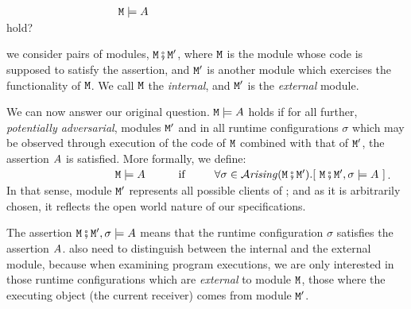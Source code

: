 
 \\
$~ \strut  \hspace{1.3in}\ {\mbox{\tt{\ensuremath{{\mbox{\tt{M}}}}}}} \models A$ \\
hold? 
   
  we consider
 pairs of modules, 
${\mbox{\tt{\ensuremath{{\mbox{\tt{M}}}}}}} \fatsemi {{\mbox{\tt{\ensuremath{{\mbox{\tt{M}}}}}}}'}$,  where ${\mbox{\tt{\ensuremath{{\mbox{\tt{M}}}}}}}$ is the module 
whose code is supposed to satisfy the assertion,
and ${\mbox{\tt{\ensuremath{{\mbox{\tt{M}}}}}}}'$  is  another %
 module which exercises
the functionality of ${\mbox{\tt{\ensuremath{{\mbox{\tt{M}}}}}}}$. We call ${\mbox{\tt{\ensuremath{{\mbox{\tt{M}}}}}}}$ the {\em internal}, and ${\mbox{\tt{\ensuremath{{\mbox{\tt{M}}}}}}}'$ is the {\em external} module.
    
We can now answer our original question.  ${\mbox{\tt{\ensuremath{{\mbox{\tt{M}}}}}}} \models A$ 
  holds if for all further, {\em potentially adversarial}, modules ${\mbox{\tt{\ensuremath{{\mbox{\tt{M}}}}}}}'$ and in  all runtime configurations $\sigma$ which may be observed through execution of the code of ${\mbox{\tt{\ensuremath{{\mbox{\tt{M}}}}}}}$ combined with that of ${\mbox{\tt{\ensuremath{{\mbox{\tt{M}}}}}}}'$, the assertion $A$ is satisfied. More formally, we define:\\
$~ \strut  \hspace{1.3in} \M \models \A \ \ \  \ \ \ \ \ \mbox{
if               } \ \ \  \ \ \  \  \forall \sigma\in\Arising
{\M \mkpair  {\M'}}. [\ \M \mkpair  {\M'},\sigma \models \A\ ]$.  \\
In that sense, module ${\mbox{\tt{\ensuremath{{\mbox{\tt{M}}}}}}}'$ represents all possible clients of {\M}; and as it is arbitrarily chosen, it reflects the open world nature of our specifications.%
{}

The assertion ${\mbox{\tt{\ensuremath{{\mbox{\tt{M}}}}}}} \fatsemi  {{\mbox{\tt{\ensuremath{{\mbox{\tt{M}}}}}}}'},\sigma \models A$ means that the runtime configuration $\sigma$ satisfies the 
assertion $A$.  also need to distinguish between  the internal and the external module,
because when examining program executions, we are only interested
 in those runtime configurations which are {\em external} to module ${\mbox{\tt{\ensuremath{{\mbox{\tt{M}}}}}}}$, \ie those where the
 executing object (\ie the current receiver) comes from module ${\mbox{\tt{\ensuremath{{\mbox{\tt{M}}}}}}}'$. 


